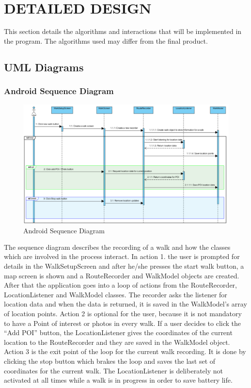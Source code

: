 \documentclass[12pt]{article}
\begin{document}
\section{DETAILED DESIGN}
This section details the algorithms and interactions that will be implemented in the program. The algorithms used may differ from the final product.
\subsection{UML Diagrams}
\subsubsection{Android Sequence Diagram}\clearpage
\begin{figure}[htp]

\begin{adjustwidth}{-3cm}{0cm}
\centering
\includegraphics[scale=0.90]{Design/route_record_sequence_diagram.PNG}
\caption{Android Sequence Diagram}
\label{Android Sequence Diagram}
\end{adjustwidth}
\end{figure}
The sequence diagram describes the recording of a walk and how the classes which are involved in the process interact.
In action 1. the user is prompted for details in the WalkSetupScreen and after he/she presses the start walk button, a map screen is shown and a RouteRecorder and WalkModel objects are created. After that the application goes into a loop of actions from the RouteRecorder, LocationListener and WalkModel classes. The recorder asks the listener for location data and when the data is returned, it is saved in the WalkModel's array of location points.
Action 2 is optional for the user, because it is not mandatory to have a Point of interest or photos in every walk. If a user decides to click the “Add POI” button, the LocationListener gives the coordinates of the current location to the RouteRecorder and they are saved in the WalkModel object.
Action 3 is the exit point of the loop for the current walk recording. It is done by clicking the stop button which brakes the loop and saves the last set of coordinates for the current walk.
The LocationListener is deliberately not activated at all times while a walk is in progress in order to save battery life.
\end{document}
